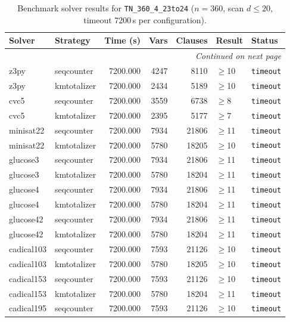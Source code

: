 \begin{longtable}{llrrrl p{}}
\caption{Benchmark solver results for \texttt{TN\_360\_4\_23to24} ($n=360$, scan $d \leq 20$, timeout 7200\,s per configuration).} \label{tab:bench-TN_360_4_23to24} \\
\toprule
Solver & Strategy & Time (s) & Vars & Clauses & Result & Status \\
\midrule
\endhead
\midrule
\multicolumn{7}{r}{\textit{Continued on next page}} \\
\midrule
\endfoot
\bottomrule
\endlastfoot
z3py & seqcounter & 7200.000 & 4247 & 8110 & $\geq$10 & \texttt{timeout} \\
z3py & kmtotalizer & 7200.000 & 2434 & 5189 & $\geq$10 & \texttt{timeout} \\
cvc5 & seqcounter & 7200.000 & 3559 & 6738 & $\geq$8 & \texttt{timeout} \\
cvc5 & kmtotalizer & 7200.000 & 2395 & 5177 & $\geq$7 & \texttt{timeout} \\
minisat22 & seqcounter & 7200.000 & 7934 & 21806 & $\geq$11 & \texttt{timeout} \\
minisat22 & kmtotalizer & 7200.000 & 5780 & 18205 & $\geq$10 & \texttt{timeout} \\
glucose3 & seqcounter & 7200.000 & 7934 & 21806 & $\geq$11 & \texttt{timeout} \\
glucose3 & kmtotalizer & 7200.000 & 5780 & 18204 & $\geq$11 & \texttt{timeout} \\
glucose4 & seqcounter & 7200.000 & 7934 & 21806 & $\geq$11 & \texttt{timeout} \\
glucose4 & kmtotalizer & 7200.000 & 5780 & 18204 & $\geq$11 & \texttt{timeout} \\
glucose42 & seqcounter & 7200.000 & 7934 & 21806 & $\geq$11 & \texttt{timeout} \\
glucose42 & kmtotalizer & 7200.000 & 5780 & 18204 & $\geq$11 & \texttt{timeout} \\
cadical103 & seqcounter & 7200.000 & 7593 & 21126 & $\geq$10 & \texttt{timeout} \\
cadical103 & kmtotalizer & 7200.000 & 5780 & 18205 & $\geq$10 & \texttt{timeout} \\
cadical153 & seqcounter & 7200.000 & 7593 & 21126 & $\geq$10 & \texttt{timeout} \\
cadical153 & kmtotalizer & 7200.000 & 5780 & 18204 & $\geq$11 & \texttt{timeout} \\
cadical195 & seqcounter & 7200.000 & 7593 & 21126 & $\geq$10 & \texttt{timeout} \\

\end{longtable}
